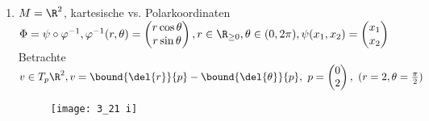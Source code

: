 \begin{exmp}
	\begin{enumerate}[label={\roman*})]
		\item $ M = \R^2 $, kartesische vs. Polarkoordinaten\\
			$ \Phi = \psi \circ \varphi^{-1}, \varphi^{-1}(r,\theta) = \begin{pmatrix}
				r \cos \theta \\ r \sin \theta
			\end{pmatrix}, r \in \R_{\geq 0}, \theta \in (0,2\pi), \psi(x_1,x_2) = \begin{pmatrix}
			x_1\\x_2
			\end{pmatrix} $\\
			Betrachte $v \in T_p\R^2, v = \bound{\del{r}}{p} - \bound{\del{\theta}}{p},\ p = \begin{pmatrix}
				0\\2
			\end{pmatrix},\ (r=2,\theta = \frac{\pi}{2})$\\
			\begin{minipage}{\linewidth}
				\begin{wrapfigure}{R}{4cm}
					\centering
					\texttt{[image: 3\_21 i]}
				\end{wrapfigure}
				

\end{minipage}
\end{enumerate}
\end{exmp}

